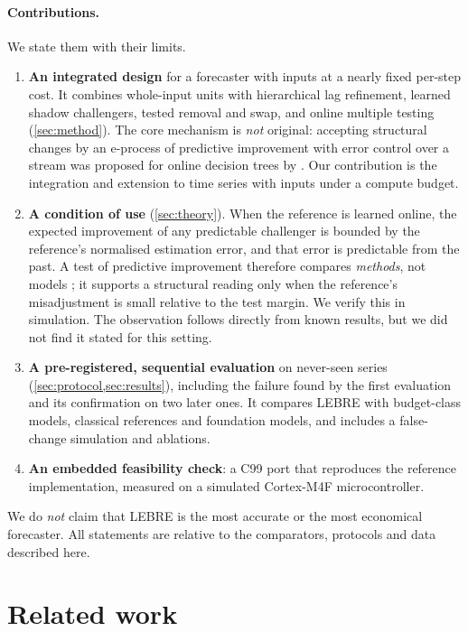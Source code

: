 \documentclass[11pt]{article}
\theoremstyle{remark}
\begin{document}
\paragraph{Contributions.} We state them with their limits.
\begin{enumerate}
  \item \textbf{An integrated design} for a forecaster with inputs at a nearly fixed per-step cost. It combines whole-input units with hierarchical lag refinement, learned shadow challengers, tested removal and swap, and online multiple testing (\cref{sec:method}). The core mechanism is \emph{not} original: accepting structural changes by an e-process of predictive improvement with error control over a stream was proposed for online decision trees by \citet{amoukou2026trees}. Our contribution is the integration and extension to time series with inputs under a compute budget.
  \item \textbf{A condition of use} (\cref{sec:theory}). When the reference is learned online, the expected improvement of any predictable challenger is bounded by the reference's normalised estimation error, and that error is predictable from the past. A test of predictive improvement therefore compares \emph{methods}, not models \citep{giacomini2006}; it supports a structural reading only when the reference's misadjustment is small relative to the test margin. We verify this in simulation. The observation follows directly from known results, but we did not find it stated for this setting.
  \item \textbf{A pre-registered, sequential evaluation} on never-seen series (\cref{sec:protocol,sec:results}), including the failure found by the first evaluation and its confirmation on two later ones. It compares LEBRE with budget-class models, classical references and foundation models, and includes a false-change simulation and ablations.
  \item \textbf{An embedded feasibility check}: a C99 port that reproduces the reference implementation, measured on a simulated Cortex-M4F microcontroller.
\end{enumerate}
We do \emph{not} claim that LEBRE is the most accurate or the most economical forecaster. All statements are relative to the comparators, protocols and data described here.

\section{Related work}\label{sec:related}
\end{document}
